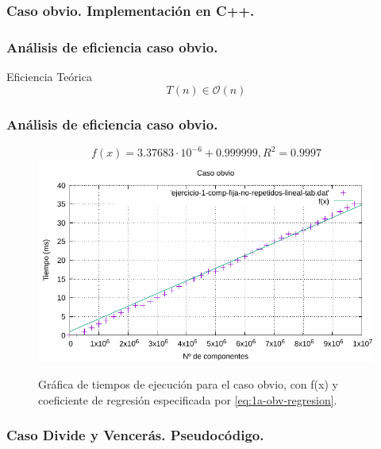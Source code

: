 \documentclass[13pt]{beamer}
\begin{document}
	 \begin{frame}
		\frametitle{Caso obvio. Implementación en C++.}
		 
	\end{frame}

	\begin{frame}
		\frametitle{Análisis de eficiencia caso obvio.}
		 \begin{block}{Eficiencia Teórica}
		 	$$T(n) \in \mathcal{O}(n)$$
		 \end{block}
	\end{frame}
		
	\begin{frame}
		\frametitle{Análisis de eficiencia caso obvio.}
		\begin{figure}
			\begin{equation}
			\boxed{f(x) = 3.37683 \cdot 10^{-6} + 0.999999, R^2 = 0.9997}
			\label{eq:1a-obv-regresion}
			\end{equation}
			\centering
			\includegraphics[scale=0.68]{img/e1a-obv}
			\caption{Gráfica de tiempos de ejecución para el caso obvio, 
				con f(x) y coeficiente de regresión especificada por \ref{eq:1a-obv-regresion}.}
			\label{fig:1a-obv-graph}
		\end{figure}
	\end{frame}

	\begin{frame}
		\frametitle{Caso Divide y Vencerás. Pseudocódigo.}
		
	\end{frame}
\end{document}
